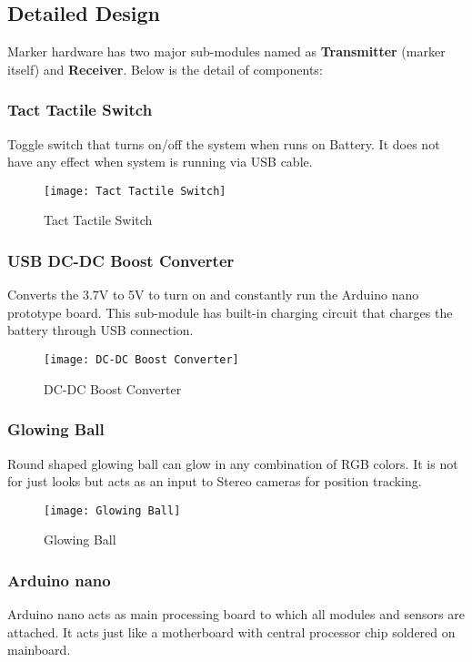 \subsection{Detailed Design}
Marker hardware has two major sub-modules named as \textbf{Transmitter} (marker itself) and \textbf{Receiver}. Below is the detail of components:
\subsubsection{Tact Tactile Switch}
Toggle switch that turns on/off the system when runs on Battery. It does not have any effect when system is running via USB cable.

\begin{figure}[h]
  \centering
  \texttt{[image: Tact Tactile Switch]}
  \caption{Tact Tactile Switch}
\end{figure}

\subsubsection{USB DC-DC Boost Converter}
Converts the 3.7V to 5V to turn on and constantly run the Arduino nano prototype board. This sub-module has built-in charging circuit that charges the battery through USB connection.

\begin{figure}[h]
  \centering
  \texttt{[image: DC-DC Boost Converter]}
  \caption{DC-DC Boost Converter}
\end{figure}


\subsubsection{Glowing Ball}
Round shaped glowing ball can glow in any combination of RGB colors. It is not for just looks but acts as an input to Stereo cameras for position tracking.

\begin{figure}[h]
  \centering
  \texttt{[image: Glowing Ball]}
  \caption{Glowing Ball}
\end{figure}


\subsubsection{Arduino nano}
Arduino nano acts as main processing board to which all modules and sensors are attached. It acts just like a motherboard with central processor chip soldered on mainboard.

